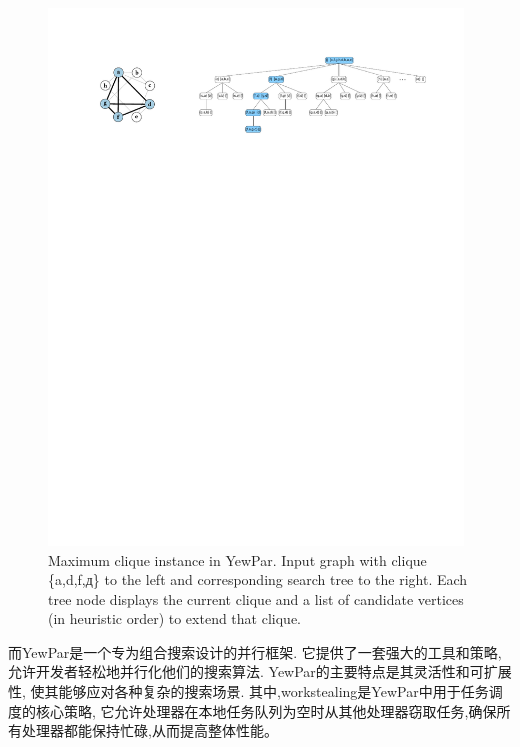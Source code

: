 \documentclass{mproj}
\begin{document}
\begin{figure}[h]
    \centering %
    \includegraphics[width=0.98\textwidth]{images/yewpar_maxclique.pdf} %
    \caption{Maximum clique instance in YewPar. Input graph with clique \{a,d,f,д\} to the left and corresponding search tree to the right.
    Each tree node displays the current clique and a list of candidate vertices (in heuristic order) to extend that clique.\cite{10.1145/3332466.3374537}} %
    \label{fig:yewpar_maxclique} %
\end{figure}
\FloatBarrier

而YewPar是一个专为组合搜索设计的并行框架.
它提供了一套强大的工具和策略,允许开发者轻松地并行化他们的搜索算法.
YewPar的主要特点是其灵活性和可扩展性,
使其能够应对各种复杂的搜索场景.
其中,workstealing是YewPar中用于任务调度的核心策略,
它允许处理器在本地任务队列为空时从其他处理器窃取任务,确保所有处理器都能保持忙碌,从而提高整体性能。
\end{document}

